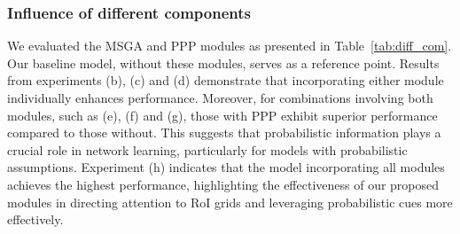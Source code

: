 \documentclass[journal]{IEEEtran}
\begin{document}
	\subsubsection{Influence of different components}
	We evaluated the MSGA and PPP modules as presented in Table~\ref{tab:diff_com}. Our baseline model, without these modules, serves as a reference point. Results from experiments (b), (c) and (d) demonstrate that incorporating either module individually enhances performance. Moreover, for combinations involving both modules, such as (e), (f) and (g), those with PPP exhibit superior performance compared to those without. This suggests that probabilistic information plays a crucial role in network learning, particularly for models with probabilistic assumptions. Experiment (h) indicates that the model incorporating all modules achieves the highest performance, highlighting the effectiveness of our proposed modules in directing attention to RoI grids and leveraging probabilistic cues more effectively.
	
	
\end{document}
